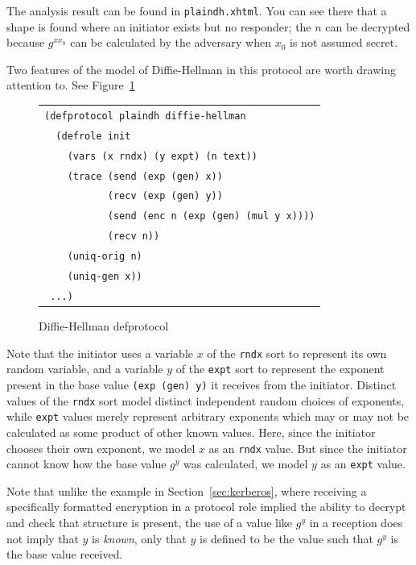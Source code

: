 The analysis result can be found in \texttt{plaindh.xhtml}.  You can see
there that a shape is found where an initiator exists but no
responder; the $n$ can be decrypted because $g^{x x_0}$ can be
calculated by the adversary when $x_0$ is not assumed secret.

Two features of the {\cpsa} model of Diffie-Hellman in this protocol are
worth drawing attention to.  See Figure~\ref{fig:plaindh defprotocol}

\begin{figure}
\begin{center}
\begin{tabular}{l}
\verb|(defprotocol plaindh diffie-hellman|\\
\verb|  (defrole init|\\
\verb|    (vars (x rndx) (y expt) (n text))|\\
\verb|    (trace (send (exp (gen) x))|\\
\verb|           (recv (exp (gen) y)) |\\
\verb|           (send (enc n (exp (gen) (mul y x))))|\\
\verb|           (recv n))|\\
\verb|    (uniq-orig n)|\\
\verb|    (uniq-gen x))|\\
\verb| ...)|
\end{tabular}
\end{center}
\caption{Diffie-Hellman defprotocol}
\label{fig:plaindh defprotocol}
\end{figure}

  Note that the initiator uses a variable
$x$ of the \texttt{rndx} sort to represent its own random variable,
and a variable $y$ of the \texttt{expt} sort to represent the exponent
present in the base value \texttt{(exp (gen) y)} it receives from the
initiator.  Distinct values of the \texttt{rndx} sort model distinct
independent random choices of exponents, while \texttt{expt} values
merely represent arbitrary exponents which may or may not be
calculated as some product of other known values.  Here, since the
initiator chooses their own exponent, we model $x$ as an \texttt{rndx}
value.  But since the initiator cannot know how the base value $g^y$
was calculated, we model $y$ as an \texttt{expt} value.

Note that unlike the example in Section~\ref{sec:kerberos},
where receiving a specifically formatted encryption in a protocol role
implied the ability to decrypt and check that structure is present,
the use of a value like $g^y$ in a reception does not imply that $y$
is \emph{known}, only that $y$ is defined to be the value such that
$g^y$ is the base value received.

